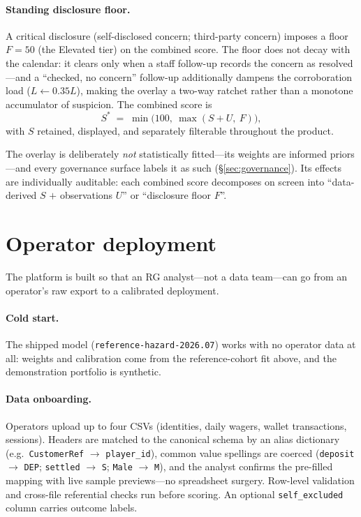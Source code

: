 \documentclass[11pt]{article}
\newcommand{\version}{reference-hazard-2026.07}
\begin{document}
\paragraph{Standing disclosure floor.} A critical disclosure (self-disclosed concern;
third-party concern) imposes a floor $F = 50$ (the Elevated tier) on the combined
score. The floor does not decay with the calendar: it clears only when a staff
follow-up records the concern as resolved---and a ``checked, no concern'' follow-up
additionally dampens the corroboration load ($L \leftarrow 0.35 L$), making the overlay
a two-way ratchet rather than a monotone accumulator of suspicion. The combined score
is
\begin{equation}
  S^{*} \;=\; \min\!\big(100,\ \max(S + U,\ F)\big),
\end{equation}
with $S$ retained, displayed, and separately filterable throughout the product.

The overlay is deliberately \emph{not} statistically fitted---its weights are informed
priors---and every governance surface labels it as such (\S\ref{sec:governance}). Its
effects are individually auditable: each combined score decomposes on screen into
``data-derived $S$ $+$ observations $U$'' or ``disclosure floor $F$''.

\section{Operator deployment}\label{sec:deployment}

The platform is built so that an RG analyst---not a data team---can go from an
operator's raw export to a calibrated deployment.

\paragraph{Cold start.} The shipped model (\texttt{\version}) works with no operator
data at all: weights and calibration come from the reference-cohort fit above, and the
demonstration portfolio is synthetic.

\paragraph{Data onboarding.} Operators upload up to four CSVs (identities, daily
wagers, wallet transactions, sessions). Headers are matched to the canonical schema by
an alias dictionary (e.g.\ \texttt{CustomerRef} $\to$ \texttt{player\_id}), common
value spellings are coerced (\texttt{deposit} $\to$ \texttt{DEP}; \texttt{settled}
$\to$ \texttt{S}; \texttt{Male} $\to$ \texttt{M}), and the analyst
confirms the pre-filled mapping with live sample previews---no spreadsheet surgery.
Row-level validation and cross-file referential checks run before scoring. An optional
\texttt{self\_excluded} column carries outcome labels.
\end{document}

